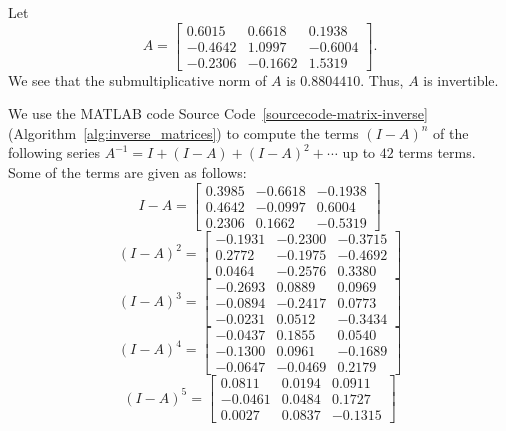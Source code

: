\begin{example}
 Let
\[ A = 
\begin{bmatrix}
    0.6015 & 0.6618 & 0.1938 \\
   -0.4642 & 1.0997 & -0.6004 \\
   -0.2306 & -0.1662 & 1.5319
\end{bmatrix}.
\]
\newline
We see that the submultiplicative norm of $A$ is $0.8804410$. Thus, $A$ is invertible. 
\newline

We use the MATLAB code Source Code~\ref{sourcecode-matrix-inverse} (Algorithm~\ref{alg:inverse_matrices}) to compute the terms $(I-A)^{n}$ of the following series $A^{-1} = I + (I -A ) + (I - A)^2 + \cdots$ up to $42$ terms terms. Some of the terms are given as follows:\newline   
\[
I - A =
\begin{bmatrix}
    0.3985 & -0.6618 & -0.1938 \\
    0.4642 & -0.0997 & 0.6004 \\
    0.2306 & 0.1662 & -0.5319
\end{bmatrix}
\]
\newline
\[
(I - A)^2 =
\begin{bmatrix}
   -0.1931 & -0.2300 & -0.3715 \\
    0.2772 & -0.1975 & -0.4692 \\
    0.0464 & -0.2576 & 0.3380
\end{bmatrix}
\]
\newline
\[
(I - A)^3 =
\begin{bmatrix}
   -0.2693 & 0.0889 & 0.0969 \\
   -0.0894 & -0.2417 & 0.0773 \\
   -0.0231 & 0.0512 & -0.3434
\end{bmatrix}
\]
\newline
\[
(I - A)^4 =
\begin{bmatrix}
   -0.0437 & 0.1855 & 0.0540 \\
   -0.1300 & 0.0961 & -0.1689 \\
   -0.0647 & -0.0469 & 0.2179
\end{bmatrix}
\]
\newline
\[
(I - A)^5 =
\begin{bmatrix}
    0.0811 & 0.0194 & 0.0911 \\
   -0.0461 & 0.0484 & 0.1727 \\
    0.0027 & 0.0837 & -0.1315
\end{bmatrix}
\]
\newline


\end{example}
